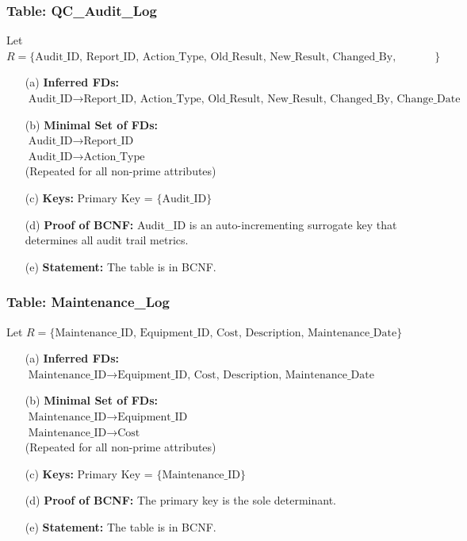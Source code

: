 \documentclass[12pt, a4paper]{article}
\begin{document}
\subsubsection{Table: QC\_Audit\_Log}
Let $R = \{ \text{Audit\_ID, Report\_ID, Action\_Type, Old\_Result, New\_Result, Changed\_By, Change\_Date} \}$
\begin{enumerate}
    \item[(a)] \textbf{Inferred FDs:} $\text{Audit\_ID} \rightarrow \text{Report\_ID, Action\_Type, Old\_Result, New\_Result, Changed\_By, Change\_Date}$
    \item[(b)] \textbf{Minimal Set of FDs:} 
    \\ $\text{Audit\_ID} \rightarrow \text{Report\_ID}$
    \\ $\text{Audit\_ID} \rightarrow \text{Action\_Type}$
    \\ (Repeated for all non-prime attributes)
    \item[(c)] \textbf{Keys:} Primary Key = $\{ \text{Audit\_ID} \}$
    \item[(d)] \textbf{Proof of BCNF:} Audit\_ID is an auto-incrementing surrogate key that determines all audit trail metrics.
    \item[(e)] \textbf{Statement:} The table is in BCNF.
\end{enumerate}

\subsubsection{Table: Maintenance\_Log}
Let $R = \{ \text{Maintenance\_ID, Equipment\_ID, Cost, Description, Maintenance\_Date} \}$
\begin{enumerate}
    \item[(a)] \textbf{Inferred FDs:} $\text{Maintenance\_ID} \rightarrow \text{Equipment\_ID, Cost, Description, Maintenance\_Date}$
    \item[(b)] \textbf{Minimal Set of FDs:} 
    \\ $\text{Maintenance\_ID} \rightarrow \text{Equipment\_ID}$
    \\ $\text{Maintenance\_ID} \rightarrow \text{Cost}$
    \\ (Repeated for all non-prime attributes)
    \item[(c)] \textbf{Keys:} Primary Key = $\{ \text{Maintenance\_ID} \}$
    \item[(d)] \textbf{Proof of BCNF:} The primary key is the sole determinant.
    \item[(e)] \textbf{Statement:} The table is in BCNF.
\end{enumerate}
\end{document}
